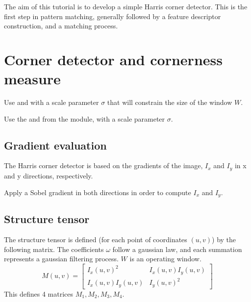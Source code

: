 \def\difficulty{1}
\begin{note}The aim of this tutorial is to develop a simple Harris corner detector. This is the first step in pattern matching, generally followed by a feature descriptor construction, and a matching process.\end{note}

\vspace*{-10pt}

\section{Corner detector and cornerness measure}

\vspace*{-10pt}

\begin{mcomment}
\begin{mremark}
 Use  and  with a scale parameter $\sigma$ that will constrain the size of the window $W$.
\end{mremark}
\end{mcomment}

\begin{pcomment}
\begin{premark}
 Use the  and  from the  module, with a scale parameter $\sigma$.
\end{premark}
\end{pcomment}

\vspace*{-3pt}

\subsection{Gradient evaluation}

The Harris corner detector is based on the gradients of the image, $I_x$ and $I_y$ in x and y directions, respectively.

\begin{qbox}
 Apply a Sobel gradient in both directions in order to compute $I_x$ and $I_y$.
\end{qbox}


\subsection{Structure tensor}
The structure tensor is defined (for each point of coordinates $(u,v)$) by the following matrix. The coefficients $\omega$ follow a gaussian law, and each summation represents a gaussian filtering process. $W$ is an operating window.\vspace*{-7pt}
\[
M(u,v)=
\begin{bmatrix}
 I_x(u,v)^2 & I_x(u,v) I_y(u,v) \\
 I_x(u,v) I_y(u,v) &  I_y(u,v)^2
\end{bmatrix} \]
This defines 4 matrices $M_1, M_2, M_3, M_4$.



